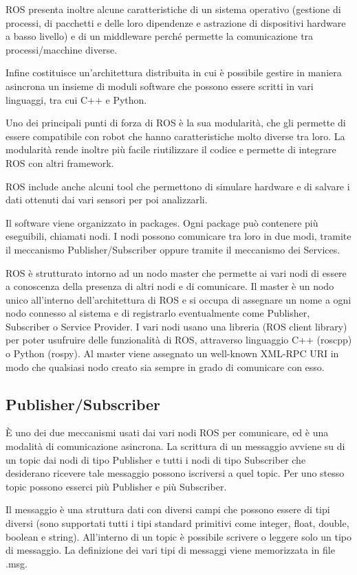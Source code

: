 \documentclass[Lau, binding=0.6cm, oneside]{sapthesis}
\begin{document}
ROS presenta inoltre alcune caratteristiche di un sistema operativo (gestione di processi, di pacchetti e delle loro dipendenze e astrazione di dispositivi hardware a basso livello) e di un middleware perché permette la comunicazione tra processi/macchine diverse.

Infine costituisce un’architettura distribuita in cui è possibile gestire in maniera asincrona un insieme di moduli software che possono essere scritti in vari linguaggi, tra cui C++ e Python.

Uno dei principali punti di forza di ROS è la sua modularità, che gli permette di essere compatibile con robot che hanno caratteristiche molto diverse tra loro.
La modularità rende inoltre più facile riutilizzare il codice e permette di integrare ROS con altri framework.

ROS include anche alcuni tool che permettono di simulare hardware e di salvare i dati ottenuti dai vari sensori per poi analizzarli.

Il software viene organizzato in packages. Ogni package può contenere più eseguibili, chiamati nodi.
I nodi possono comunicare tra loro in due modi, tramite il meccanismo Publisher/Subscriber oppure tramite il meccanismo dei Services.

ROS è strutturato intorno ad un nodo master che permette ai vari nodi di essere a conoscenza della presenza di altri nodi e di comunicare.
Il master è un nodo unico all’interno dell’architettura di ROS e si occupa di assegnare un nome a ogni nodo connesso al sistema e di registrarlo eventualmente come Publisher, Subscriber o Service Provider.
I vari nodi usano una libreria (ROS client library) per poter usufruire delle funzionalità di ROS, attraverso linguaggio C++ (roscpp) o Python (rospy).
Al master viene assegnato un well-known XML-RPC URI in modo che qualsiasi nodo creato sia sempre in grado di comunicare con esso\cite{fonte3}.

\subsection{Publisher/Subscriber}
È uno dei due meccanismi usati dai vari nodi ROS per comunicare, ed è una modalità di comunicazione asincrona.
La scrittura di un messaggio avviene su di un topic dai nodi di tipo Publisher e tutti i nodi di tipo Subscriber che desiderano ricevere tale messaggio possono iscriversi a quel topic.
Per uno stesso topic possono esserci più Publisher e più Subscriber.

Il messaggio è una struttura dati con diversi campi che possono essere di tipi diversi (sono supportati tutti i tipi standard primitivi come integer, float, double, boolean e string).
All’interno di un topic è possibile scrivere o leggere solo un tipo di messaggio.
La definizione dei vari tipi di messaggi viene memorizzata in file .msg.
\end{document}
